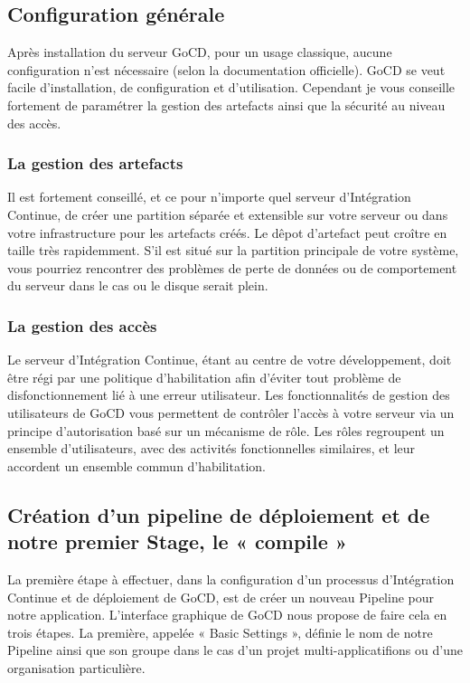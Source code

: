       \subsection{Configuration générale}
      Après installation du serveur GoCD, pour un usage classique, aucune configuration n'est nécessaire (selon la documentation officielle). GoCD se veut facile d'installation, de configuration et d'utilisation. Cependant je vous conseille fortement de paramétrer la gestion des artefacts ainsi que la sécurité au niveau des accès.

        \subsubsection{La gestion des artefacts}
        Il est fortement conseillé, et ce pour n'importe quel serveur d'Intégration Continue, de créer une partition séparée et extensible sur votre serveur ou dans votre infrastructure pour les artefacts créés. Le dêpot d'artefact peut croître en taille très rapidemment. S'il est situé sur la partition principale de votre système, vous pourriez rencontrer des problèmes de perte de données ou de comportement du serveur dans le cas ou le disque serait plein.

        \subsubsection{La gestion des accès}
        Le serveur d'Intégration Continue, étant au centre de votre développement, doit être régi par une politique d'habilitation afin d'éviter tout problème de disfonctionnement lié à une erreur utilisateur. Les fonctionnalités de gestion des utilisateurs de GoCD vous permettent de contrôler l'accès à votre serveur via un principe d'autorisation basé sur un mécanisme de rôle. Les rôles regroupent un ensemble d'utilisateurs, avec des activités fonctionnelles similaires, et leur accordent un ensemble commun d'habilitation.

      \subsection{Création d'un pipeline de déploiement et de notre premier Stage, le « compile »}
      La première étape à effectuer, dans la configuration d'un processus d'Intégration Continue et de déploiement de GoCD, est de créer un nouveau Pipeline pour notre application. L'interface graphique de GoCD nous propose de faire cela en trois étapes. La première, appelée « Basic Settings », définie le nom de notre Pipeline ainsi que son groupe dans le cas d'un projet multi-applicatifions ou d'une organisation particulière.\\

